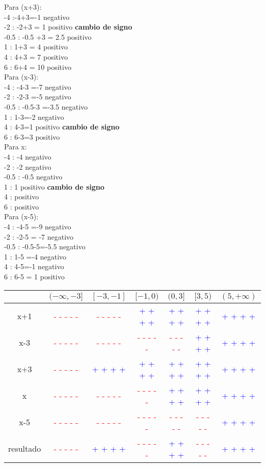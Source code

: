\documentclass[12pt]{article}
\newcommand{\p}{\textcolor{Blue}{+ + + +}}
\newcommand{\n}{\textcolor{Red}{- - - - -}}
\begin{document}
    Para (x+3):\\
    -4 :-4+3=-1 negativo\\
    -2 : -2+3 = 1 positivo \textbf{cambio de signo}\\
    -0.5 : -0.5 +3 = 2.5 positivo\\
    1 : 1+3 = 4 positivo\\
    4 : 4+3 = 7 positivo\\
    6 : 6+4 = 10 positivo\\

    Para (x-3):\\
    -4 : -4-3 =-7 negativo\\
    -2 : -2-3 =-5 negativo\\
    -0.5 : -0.5-3 =-3.5 negativo\\
    1 : 1-3=-2 negativo\\
    4 : 4-3=1 positivo \textbf{cambio de signo}\\
    6 : 6-3=3 positivo\\

    Para x:\\
    -4 : -4 negativo\\
    -2 : -2 negativo\\
    -0.5 : -0.5 negativo\\
    1 : 1 positivo  \textbf{cambio de signo}\\
    4 : positivo\\
    6 : positivo\\

    Para (x-5):\\
    -4 : -4-5 =-9 negativo\\
    -2 : -2-5 = -7 negativo\\
    -0.5 : -0.5-5=-5.5 negativo\\
    1 : 1-5 =-4 negativo\\
    4 : 4-5=-1 negativo \\
    6 : 6-5 = 1 positivo\\


\vspace*{1cm}
    \begin{tabular}{|c|c|c|c|c|c|c|}
        \hline
            &$ (-\infty,-3]$&   $[-3,-1]$ &$ [-1,0) $ &$(0,3]$& $ [3,5) $& $(5,+\infty)$\\\hline
        x+1 &  \n   & \n    & \p    & \p    & \p    & \p \\\hline
        x-3 & \n    & \n    & \n    & \n    & \p    & \p \\\hline
        x+3 & \n    & \p    & \p    & \p    & \p    & \p \\\hline
        x   & \n    &  \n   & \n    & \p    & \p    & \p \\\hline
        x-5 & \n    &  \n   & \n    & \n    & \n    & \p \\\hline
    resultado& \n   & \p    & \n    & \p    & \n    & \p \\\hline
    \end{tabular}
    \vspace*{1cm}
\end{document}

